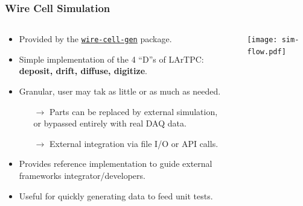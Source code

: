 \documentclass[xcolor=dvipsnames]{beamer}
\begin{document}
\begin{frame}

  \frametitle{Wire Cell Simulation}

  \begin{columns}
    \begin{column}{0.75\textwidth}
      \begin{itemize}\footnotesize
      \item Provided by the \href{https://github.com/WireCell/wire-cell-gen}{\texttt{wire-cell-gen}} package.
      \item Simple implementation of the 4 ``D''s of LArTPC:\\
        \textbf{deposit, drift, diffuse, digitize}.
      \item Granular, user may tak as little or as much as needed.
        \begin{itemize}\scriptsize
        \item[$\rightarrow$] Parts can be replaced by external
          simulation, \\or bypassed entirely with real DAQ data.
        \item[$\rightarrow$] External integration via file I/O or API calls.
        \end{itemize}
      \item Provides reference implementation to guide external frameworks integrator/developers.
      \item Useful for quickly generating data to feed unit tests.
      \end{itemize}
    \end{column}
    \begin{column}{0.25\textwidth}
      \vspace{-10mm}
      \texttt{[image: sim-flow.pdf]}
    \end{column}
  \end{columns}
\end{frame}
\end{document}
